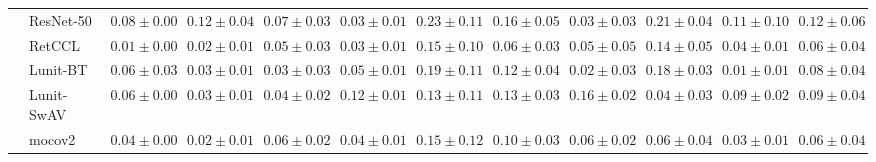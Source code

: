 \begin{tabular}{ll|cccc|c|cccc|c}
 & ResNet-50 & $0.08 \pm 0.00$ & $0.12 \pm 0.04$ & $0.07 \pm 0.03$ & $0.03 \pm 0.01$ & $0.23 \pm 0.11$ & $0.16 \pm 0.05$ & $0.03 \pm 0.03$ & $0.21 \pm 0.04$ & $0.11 \pm 0.10$ & $0.12 \pm 0.06$ \\
 & RetCCL & $0.01 \pm 0.00$ & $0.02 \pm 0.01$ & $0.05 \pm 0.03$ & $0.03 \pm 0.01$ & $0.15 \pm 0.10$ & $0.06 \pm 0.03$ & $0.05 \pm 0.05$ & $0.14 \pm 0.05$ & $0.04 \pm 0.01$ & $0.06 \pm 0.04$ \\
 & Lunit-BT & $0.06 \pm 0.03$ & $0.03 \pm 0.01$ & $0.03 \pm 0.03$ & $0.05 \pm 0.01$ & $0.19 \pm 0.11$ & $0.12 \pm 0.04$ & $0.02 \pm 0.03$ & $0.18 \pm 0.03$ & $\mathbf{0.01 \pm 0.01}$ & $0.08 \pm 0.04$ \\
 & Lunit-SwAV & $0.06 \pm 0.00$ & $0.03 \pm 0.01$ & $0.04 \pm 0.02$ & $0.12 \pm 0.01$ & $0.13 \pm 0.11$ & $0.13 \pm 0.03$ & $0.16 \pm 0.02$ & $0.04 \pm 0.03$ & $0.09 \pm 0.02$ & $0.09 \pm 0.04$ \\
 & mocov2 & $0.04 \pm 0.00$ & $0.02 \pm 0.01$ & $0.06 \pm 0.02$ & $0.04 \pm 0.01$ & $0.15 \pm 0.12$ & $0.10 \pm 0.03$ & $0.06 \pm 0.02$ & $0.06 \pm 0.04$ & $0.03 \pm 0.01$ & $0.06 \pm 0.04$ \\
\cline{1-12}
\bottomrule
\end{tabular}
